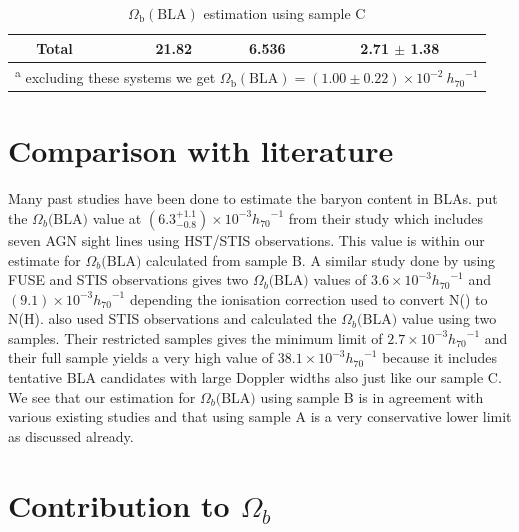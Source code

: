 \begin{table}[!h]
\begin{tabular}{ccccc}
            \hline 
 
            Total &  &  21.82 &  6.536  & 2.71 $\pm$  1.38 \\ 

            \hline \hline 
            \multicolumn{5}{l}{\textsuperscript{a} \footnotesize{excluding these systems we get $\Omega_\text{b}(\text{BLA}) = (1.00 \pm  0.22) \times 10^{-2} \ {h_{70}}^{-1}$}} \\
        \end{tabular}
    \caption{$\Omega_\text{b}(\text{BLA})$ estimation using sample C}
    \label{tab:Omega_b_sampleC}
\end{table}


\section{Comparison with literature}

Many past studies have been done to estimate the baryon content in BLAs. \citet{Danforth_2010} put the $\Omega_b\text{(BLA)}$ value at $(6.3^{+1.1}_{-0.8})\times 10^{-3} {h_{70}}^{-1}$ from their study which includes seven AGN sight lines using HST/STIS observations. This value is within our estimate for $\Omega_b\text{(BLA)}$ calculated from sample B. A similar study done by \citet{Lehner-2007} using FUSE and STIS observations gives two $\Omega_b\text{(BLA)}$ values of $3.6\times 10^{-3} {h_{70}}^{-1}$ and $(9.1)\times 10^{-3} {h_{70}}^{-1}$ depending the ionisation correction used to convert N() to N(H). \citet{Richter-2006} also used STIS observations and calculated the $\Omega_b\text{(BLA)}$ value using two samples. Their restricted samples gives the minimum limit of $2.7\times 10^{-3} {h_{70}}^{-1}$ and their full sample yields a very high value of $38.1\times 10^{-3} {h_{70}}^{-1}$ because it includes tentative BLA candidates with large Doppler widths also just like our sample C. We see that our estimation for $\Omega_b\text{(BLA)}$ using sample B is in agreement with various existing studies and that using sample A is a very conservative lower limit as discussed already.


\section{Contribution to $\Omega_b$}


